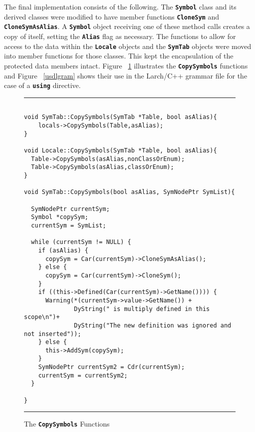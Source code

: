 \documentclass[12pt]{article} %
\newcommand{\reserved}[1]{\textbf{\texttt{#1}}} %
\newcommand{\UNSPACEFORBOX}{\vspace{-2ex}}
\newcommand{\HLINE}{\UNSPACEFORBOX%
\begin{flushleft}\rule{\textwidth}{0.01in}\end{flushleft}%
\UNSPACEFORBOX}
\newenvironment{BFIGURE}{

\begin{figure}
\small
\HLINE
}{
\HLINE
\normalsize
\end{figure}
}
\begin{document}
The final implementation consists of the following. The \reserved{Symbol} class
and its derived classes were modified to have member functions
\reserved{CloneSym} and \reserved{CloneSymAsAlias}. A \reserved{Symbol}
object receiving one of these method calls creates a copy of itself,
setting the \reserved{Alias} flag as necessary. The functions to allow
for access to the data within the \reserved{Locale} objects and the
\reserved{SymTab} objects were moved into member functions for those
classes. This kept the encapsulation of the protected data members
intact. Figure ~\ref{cpsymcpp} illustrates the
\reserved{CopySymbols} functions and Figure ~\ref{usdlgram} shows
their use in the Larch/C++ grammar file for the case of a
\reserved{using} directive.
\begin{BFIGURE}
\begin{verbatim}

void SymTab::CopySymbols(SymTab *Table, bool asAlias){ 
    locals->CopySymbols(Table,asAlias);
}

void Locale::CopySymbols(SymTab *Table, bool asAlias){
  Table->CopySymbols(asAlias,nonClassOrEnum);
  Table->CopySymbols(asAlias,classOrEnum);
}

void SymTab::CopySymbols(bool asAlias, SymNodePtr SymList){
 
  SymNodePtr currentSym;
  Symbol *copySym;
  currentSym = SymList;

  while (currentSym != NULL) {
    if (asAlias) {
      copySym = Car(currentSym)->CloneSymAsAlias();
    } else {
      copySym = Car(currentSym)->CloneSym();
    }
    if ((this->Defined(Car(currentSym)->GetName()))) {
      Warning(*(currentSym->value->GetName()) +
              DyString(" is multiply defined in this scope\n")+
              DyString("The new definition was ignored and not inserted"));
    } else {
      this->AddSym(copySym);
    }
    SymNodePtr currentSym2 = Cdr(currentSym);
    currentSym = currentSym2;
  }

}
\end{verbatim}
\caption{The \reserved{CopySymbols} Functions}
\label{cpsymcpp}
\end{BFIGURE}
\end{document}
